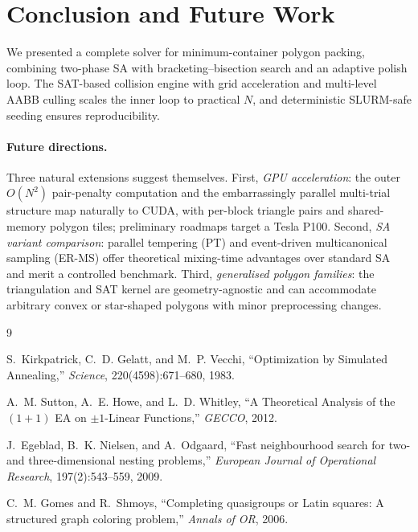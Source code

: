 \documentclass[10pt,twocolumn]{article}
\begin{document}
\section{Conclusion and Future Work}
\label{sec:conclusion}

We presented a complete solver for minimum-container polygon packing,
combining two-phase SA with bracketing--bisection search and an adaptive
polish loop.  The SAT-based collision engine with grid acceleration and
multi-level AABB culling scales the inner loop to practical $N$, and
deterministic SLURM-safe seeding ensures reproducibility.

\paragraph{Future directions.}
Three natural extensions suggest themselves.
First, \emph{GPU acceleration}: the outer $O(N^2)$ pair-penalty
computation and the embarrassingly parallel multi-trial structure map
naturally to CUDA, with per-block triangle pairs and shared-memory
polygon tiles; preliminary roadmaps target a Tesla P100.
Second, \emph{SA variant comparison}: parallel tempering (PT) and
event-driven multicanonical sampling (ER-MS) offer theoretical
mixing-time advantages over standard SA and merit a controlled benchmark.
Third, \emph{generalised polygon families}: the triangulation and SAT
kernel are geometry-agnostic and can accommodate arbitrary convex or
star-shaped polygons with minor preprocessing changes.


\begin{thebibliography}{9}

S.~Kirkpatrick, C.~D. Gelatt, and M.~P. Vecchi,
``Optimization by Simulated Annealing,''
\textit{Science}, 220(4598):671--680, 1983.

A.~M. Sutton, A.~E. Howe, and L.~D. Whitley,
``A Theoretical Analysis of the $(1+1)$ EA on $\pm1$-Linear Functions,''
\textit{GECCO}, 2012.

J.~Egeblad, B.~K. Nielsen, and A.~Odgaard,
``Fast neighbourhood search for two- and three-dimensional nesting problems,''
\textit{European Journal of Operational Research}, 197(2):543--559, 2009.

C.~M. Gomes and R.~Shmoys,
``Completing quasigroups or Latin squares: A structured graph coloring problem,''
\textit{Annals of OR}, 2006.

\end{thebibliography}
\end{document}
